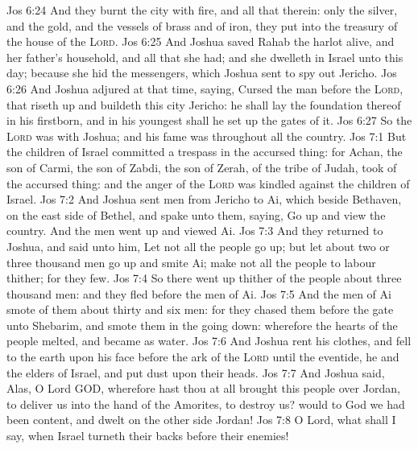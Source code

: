\vs Jos 6:24 And they burnt the city with fire, and all that  therein: only the silver, and the gold, and the vessels of brass and of iron, they put into the treasury of the house of the \textsc{Lord}.
\vs Jos 6:25 And Joshua saved Rahab the harlot alive, and her father's household, and all that she had; and she dwelleth in Israel  unto this day; because she hid the messengers, which Joshua sent to spy out Jericho.
\vs Jos 6:26 And Joshua adjured  at that time, saying, Cursed  the man before the \textsc{Lord}, that riseth up and buildeth this city Jericho: he shall lay the foundation thereof in his firstborn, and in his youngest  shall he set up the gates of it.
\vs Jos 6:27 So the \textsc{Lord} was with Joshua; and his fame was  throughout all the country.
\vs Jos 7:1 But the children of Israel committed a trespass in the accursed thing: for Achan, the son of Carmi, the son of Zabdi, the son of Zerah, of the tribe of Judah, took of the accursed thing: and the anger of the \textsc{Lord} was kindled against the children of Israel.
\vs Jos 7:2 And Joshua sent men from Jericho to Ai, which  beside Bethaven, on the east side of Bethel, and spake unto them, saying, Go up and view the country. And the men went up and viewed Ai.
\vs Jos 7:3 And they returned to Joshua, and said unto him, Let not all the people go up; but let about two or three thousand men go up and smite Ai;  make not all the people to labour thither; for they  few.
\vs Jos 7:4 So there went up thither of the people about three thousand men: and they fled before the men of Ai.
\vs Jos 7:5 And the men of Ai smote of them about thirty and six men: for they chased them  before the gate  unto Shebarim, and smote them in the going down: wherefore the hearts of the people melted, and became as water.
\vs Jos 7:6 And Joshua rent his clothes, and fell to the earth upon his face before the ark of the \textsc{Lord} until the eventide, he and the elders of Israel, and put dust upon their heads.
\vs Jos 7:7 And Joshua said, Alas, O Lord GOD, wherefore hast thou at all brought this people over Jordan, to deliver us into the hand of the Amorites, to destroy us? would to God we had been content, and dwelt on the other side Jordan!
\vs Jos 7:8 O Lord, what shall I say, when Israel turneth their backs before their enemies!
